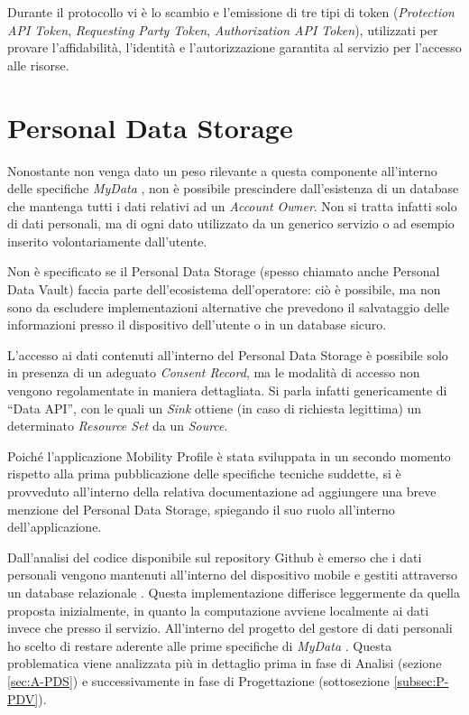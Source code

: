 Durante il protocollo vi \`e lo scambio e l’emissione di tre tipi di token (\textit{Protection API Token}, \textit{Requesting Party Token}, \textit{Authorization API Token}), utilizzati per provare l’affidabilit\`a, l’identit\`a e l’autorizzazione garantita al servizio per l’accesso alle risorse.

\section{Personal Data Storage}
Nonostante non venga dato un peso rilevante a questa componente all’interno delle specifiche \textit{MyData} \cite{githubmydatastack}, non \`e possibile prescindere dall’esistenza di un database che mantenga tutti i dati relativi ad un \textit{Account Owner}. Non si tratta infatti solo di dati personali, ma di ogni dato utilizzato da un generico servizio o ad esempio inserito volontariamente dall’utente.

Non \`e specificato se il Personal Data Storage (spesso chiamato anche Personal Data Vault) faccia parte dell’ecosistema dell’operatore: ci\`o \`e possibile, ma non sono da escludere implementazioni alternative che prevedono il salvataggio delle informazioni presso il dispositivo dell’utente o in un database sicuro.

L’accesso ai dati contenuti all’interno del Personal Data Storage \`e possibile solo in presenza di un adeguato \textit{Consent Record}, ma le modalit\`a di accesso non vengono regolamentate in maniera dettagliata. Si parla infatti genericamente di “Data API”, con le quali un \textit{Sink} ottiene (in caso di richiesta legittima) un determinato \textit{Resource Set} da un \textit{Source}.

Poich\'e l’applicazione Mobility Profile \`e stata sviluppata in un secondo momento rispetto alla prima pubblicazione delle specifiche tecniche suddette, si \`e provveduto all’interno della relativa documentazione \cite{githubmobilityprofilespecification} ad aggiungere una breve menzione del Personal Data Storage, spiegando il suo ruolo all’interno dell’applicazione.

Dall’analisi del codice disponibile sul repository Github \cite{githubmobilityprofile} \`e emerso che i dati personali vengono mantenuti all’interno del dispositivo mobile e gestiti attraverso un database relazionale \cite{ormSugar}. Questa implementazione differisce leggermente da quella proposta inizialmente, in quanto la computazione avviene localmente ai dati invece che presso il servizio. All’interno del progetto del gestore di dati personali ho scelto di restare aderente alle prime specifiche di \textit{MyData} \cite{githubmydatastack}. Questa problematica viene analizzata pi\`u in dettaglio prima in fase di Analisi (sezione \ref{sec:A-PDS}) e successivamente in fase di Progettazione (sottosezione \ref{subsec:P-PDV}).